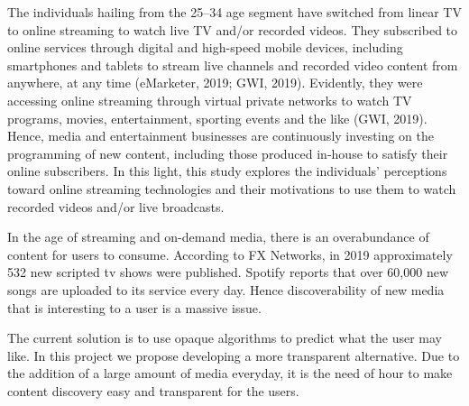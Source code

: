 The individuals hailing from the 25–34 age segment have switched from linear TV to online streaming to watch live TV and/or recorded videos. They subscribed to online services through
digital and high-speed mobile devices, including smartphones and tablets to stream live channels and recorded video content from anywhere, at any time (eMarketer, 2019; GWI, 2019). Evidently, they were accessing online streaming through virtual private networks to watch TV programs, movies, entertainment, sporting events and the like (GWI, 2019). Hence, media and entertainment businesses are continuously investing on the programming of new content, including those produced in-house to satisfy their online subscribers. In this light, this study explores the individuals’ perceptions toward online streaming technologies and their motivations to use them to watch recorded videos and/or live broadcasts.\newline

In the age of streaming and on-demand media, there is an overabundance of content for users to consume.
According to FX Networks, in 2019 approximately 532 new scripted tv shows were published.
Spotify reports that over 60,000 new songs are uploaded to its service every day.
Hence discoverability of new media that is interesting to a user is a massive issue. \newline

The current solution is to use opaque algorithms to predict what the user may like. In this project we propose developing a more transparent alternative. 
Due to the addition of a large amount of media everyday, it is the need of hour to make content discovery easy and transparent for the users. 


